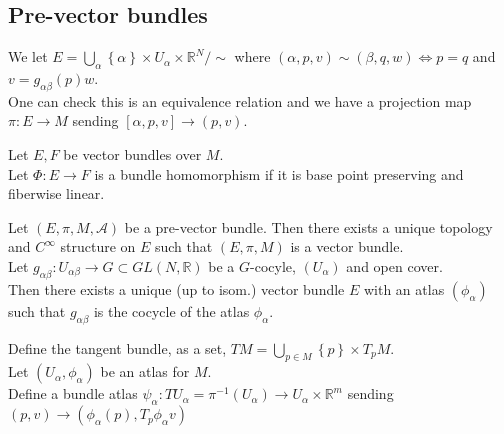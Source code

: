 \documentclass[../main.tex]{subfiles}
\begin{document}
\subsection*{Pre-vector bundles}
We let $E= \bigcup_{\alpha} \left\{ \alpha \right\} \times U_\alpha\times \mathbb{R}^N /\sim$ where $( \alpha,p,v) \sim ( \beta,q, w) \iff p=q$ and $v= g_{\alpha\beta} ( p) w$.\\
One can check this is an equivalence relation and we have a projection map $\pi:E\to M$ sending $[\alpha,p,v] \to ( p,v) $.
\begin{defn}
	Let $E,F$ be vector bundles over $M$.\\
	Let $\Phi: E \to F$ is a bundle homomorphism if it is base point preserving and fiberwise linear.
\end{defn}
\begin{thm}
	Let $( E,\pi,M, \mathcal{A}) $ be a pre-vector bundle. Then there exists a unique topology and $C^{ \infty }$ structure on $E$ such that $( E,\pi,M) $ is a vector bundle.\\
	Let $g_{\alpha\beta} : U_{\alpha\beta} \to G \subset GL( N, \mathbb{R}) $ be a $G$-cocyle, $( U_\alpha) $ and open cover.\\
	Then there exists a unique (up to isom.) vector bundle $E$ with an atlas $( \phi_\alpha) $ such that $g_{\alpha\beta} $ is the cocycle of the atlas $\phi_\alpha$.
\end{thm}
\begin{defn}
	Define the tangent bundle, as a set, $TM = \bigcup_{p \in M} \left\{ p \right\} \times T_p M$.\\
	Let $( U_\alpha,\phi_\alpha )$ be an atlas for $M$.\\
	Define a bundle atlas $\psi_\alpha: TU_{\alpha} = \pi^{-1}( U_\alpha) \to U_\alpha\times \mathbb{R}^m$ sending $( p,v) \to ( \phi_\alpha( p) ,T_p\phi_\alpha v) $
\end{defn}
\end{document}
